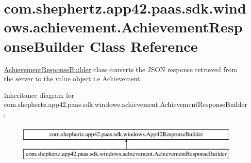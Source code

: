 \hypertarget{classcom_1_1shephertz_1_1app42_1_1paas_1_1sdk_1_1windows_1_1achievement_1_1_achievement_response_builder}{\section{com.\+shephertz.\+app42.\+paas.\+sdk.\+windows.\+achievement.\+Achievement\+Response\+Builder Class Reference}
\label{classcom_1_1shephertz_1_1app42_1_1paas_1_1sdk_1_1windows_1_1achievement_1_1_achievement_response_builder}
}


\hyperlink{classcom_1_1shephertz_1_1app42_1_1paas_1_1sdk_1_1windows_1_1achievement_1_1_achievement_response_builder}{Achievement\+Response\+Builder} class converts the J\+S\+O\+N response retrieved from the server to the value object i.\+e \hyperlink{classcom_1_1shephertz_1_1app42_1_1paas_1_1sdk_1_1windows_1_1achievement_1_1_achievement}{Achievement}  


Inheritance diagram for com.\+shephertz.\+app42.\+paas.\+sdk.\+windows.\+achievement.\+Achievement\+Response\+Builder\+:\begin{figure}[H]
\begin{center}
\leavevmode
\includegraphics[height=2.000000cm]{classcom_1_1shephertz_1_1app42_1_1paas_1_1sdk_1_1windows_1_1achievement_1_1_achievement_response_builder}
\end{center}
\end{figure}
